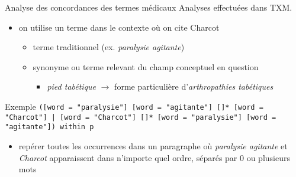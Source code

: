 \begin{frame}{Analyse des concordances des termes médicaux}
	Analyses effectuées dans \textsc{TXM}.
	\begin{itemize}
		\item on utilise un terme dans le contexte où on cite Charcot
		\begin{itemize}
			\item terme traditionnel (ex. \textit{paralysie agitante})
			\item synonyme ou terme relevant du champ conceptuel en question
			\begin{itemize}
				\item \textit{pied tabétique} $\rightarrow$ forme particulière d'\textit{arthropathies tabétiques}
			\end{itemize}
		\end{itemize}
	\end{itemize}
	\begin{block}{Exemple}
		\texttt{([word = "paralysie"] [word = "agitante"] []* [word = "Charcot"] | [word = "Charcot"] []* [word = "paralysie"] [word = "agitante"]) within p}
		\begin{itemize}
			\item repérer toutes les occurrences dans un paragraphe où \textit{paralysie agitante} et \textit{Charcot} apparaissent dans n'importe quel ordre, séparés par 0 ou plusieurs mots
		\end{itemize}
	\end{block}
\end{frame}

